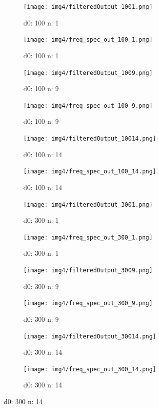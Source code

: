 \begin{figure}[H]
    \centering
    \begin{subfigure}[b]{0.16\textwidth}
        \texttt{[image: img4/filteredOutput\_1001.png]}
        \caption{d0: 100 n: 1}
        \label{fig:img4_1001_im}
    \end{subfigure}
    \begin{subfigure}[b]{0.16\textwidth}
        \texttt{[image: img4/freq\_spec\_out\_100\_1.png]}
        \caption{d0: 100 n: 1}
        \label{fig:img4_1001_fr}
    \end{subfigure}
	 \begin{subfigure}[b]{0.16\textwidth}
        \texttt{[image: img4/filteredOutput\_1009.png]}
        \caption{d0: 100 n: 9}
        \label{fig:img4_1009_im}
    \end{subfigure}
    \begin{subfigure}[b]{0.16\textwidth}
        \texttt{[image: img4/freq\_spec\_out\_100\_9.png]}
        \caption{d0: 100 n: 9}
        \label{fig:img4_1009_fr}
    \end{subfigure}	
\begin{subfigure}[b]{0.16\textwidth}
        \texttt{[image: img4/filteredOutput\_10014.png]}
        \caption{d0: 100 n: 14}
        \label{fig:img4_10014_im}
    \end{subfigure}
    \begin{subfigure}[b]{0.16\textwidth}
        \texttt{[image: img4/freq\_spec\_out\_100\_14.png]}
        \caption{d0: 100 n: 14}
        \label{fig:img4_10014_fr}
    \end{subfigure}	
    
    
      \begin{subfigure}[b]{0.16\textwidth}
        \texttt{[image: img4/filteredOutput\_3001.png]}
        \caption{d0: 300 n: 1}
        \label{fig:img4_3001_im}
    \end{subfigure}
    \begin{subfigure}[b]{0.16\textwidth}
        \texttt{[image: img4/freq\_spec\_out\_300\_1.png]}
        \caption{d0: 300 n: 1}
        \label{fig:img4_3001_fr}
    \end{subfigure}
	 \begin{subfigure}[b]{0.16\textwidth}
        \texttt{[image: img4/filteredOutput\_3009.png]}
        \caption{d0: 300 n: 9}
        \label{fig:img4_3009_im}
    \end{subfigure}
    \begin{subfigure}[b]{0.16\textwidth}
        \texttt{[image: img4/freq\_spec\_out\_300\_9.png]}
        \caption{d0: 300 n: 9}
        \label{fig:img4_3009_fr}
    \end{subfigure}	
\begin{subfigure}[b]{0.16\textwidth}
        \texttt{[image: img4/filteredOutput\_30014.png]}
        \caption{d0: 300 n: 14}
        \label{fig:img4_30014_im}
    \end{subfigure}
    \begin{subfigure}[b]{0.16\textwidth}
        \texttt{[image: img4/freq\_spec\_out\_300\_14.png]}
        \caption{d0: 300 n: 14}
        \label{fig:img4_30014_fr}
    \end{subfigure}
    

\end{figure}
